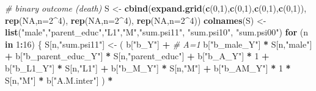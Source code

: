 \documentclass[
]{book}
\newenvironment{Shaded}{\begin{snugshade}}{\end{snugshade}}
\newcommand{\AttributeTok}[1]{\textcolor[rgb]{0.13,0.29,0.53}{#1}}
\newcommand{\CommentTok}[1]{\textcolor[rgb]{0.56,0.35,0.01}{\textit{#1}}}
\newcommand{\ConstantTok}[1]{\textcolor[rgb]{0.56,0.35,0.01}{#1}}
\newcommand{\ControlFlowTok}[1]{\textcolor[rgb]{0.13,0.29,0.53}{\textbf{#1}}}
\newcommand{\DecValTok}[1]{\textcolor[rgb]{0.00,0.00,0.81}{#1}}
\newcommand{\FunctionTok}[1]{\textcolor[rgb]{0.13,0.29,0.53}{\textbf{#1}}}
\newcommand{\NormalTok}[1]{#1}
\newcommand{\OtherTok}[1]{\textcolor[rgb]{0.56,0.35,0.01}{#1}}
\newcommand{\SpecialCharTok}[1]{\textcolor[rgb]{0.81,0.36,0.00}{\textbf{#1}}}
\newcommand{\StringTok}[1]{\textcolor[rgb]{0.31,0.60,0.02}{#1}}
\begin{document}
\begin{Shaded}
\begin{Highlighting}[]
  \CommentTok{\# binary outcome (death)}
\NormalTok{  S }\OtherTok{\textless{}{-}} \FunctionTok{cbind}\NormalTok{(}\FunctionTok{expand.grid}\NormalTok{(}\FunctionTok{c}\NormalTok{(}\DecValTok{0}\NormalTok{,}\DecValTok{1}\NormalTok{),}\FunctionTok{c}\NormalTok{(}\DecValTok{0}\NormalTok{,}\DecValTok{1}\NormalTok{),}\FunctionTok{c}\NormalTok{(}\DecValTok{0}\NormalTok{,}\DecValTok{1}\NormalTok{),}\FunctionTok{c}\NormalTok{(}\DecValTok{0}\NormalTok{,}\DecValTok{1}\NormalTok{)), }\FunctionTok{rep}\NormalTok{(}\ConstantTok{NA}\NormalTok{,}\AttributeTok{n=}\DecValTok{2}\SpecialCharTok{\^{}}\DecValTok{4}\NormalTok{), }\FunctionTok{rep}\NormalTok{(}\ConstantTok{NA}\NormalTok{,}\AttributeTok{n=}\DecValTok{2}\SpecialCharTok{\^{}}\DecValTok{4}\NormalTok{), }
             \FunctionTok{rep}\NormalTok{(}\ConstantTok{NA}\NormalTok{,}\AttributeTok{n=}\DecValTok{2}\SpecialCharTok{\^{}}\DecValTok{4}\NormalTok{))}
  \FunctionTok{colnames}\NormalTok{(S) }\OtherTok{\textless{}{-}} \FunctionTok{list}\NormalTok{(}\StringTok{"male"}\NormalTok{,}\StringTok{"parent\_educ"}\NormalTok{,}\StringTok{"L1"}\NormalTok{,}\StringTok{"M"}\NormalTok{,}\StringTok{"sum.psi11"}\NormalTok{, }\StringTok{"sum.psi10"}\NormalTok{, }\StringTok{"sum.psi00"}\NormalTok{)}
  \ControlFlowTok{for}\NormalTok{ (n }\ControlFlowTok{in} \DecValTok{1}\SpecialCharTok{:}\DecValTok{16}\NormalTok{) \{}
\NormalTok{    S[n,}\StringTok{"sum.psi11"}\NormalTok{] }\OtherTok{\textless{}{-}}\NormalTok{  ( b[}\StringTok{"b\_Y"}\NormalTok{] }\SpecialCharTok{+}                                            \CommentTok{\# A=1}
\NormalTok{                             b[}\StringTok{"b\_male\_Y"}\NormalTok{] }\SpecialCharTok{*}\NormalTok{ S[n,}\StringTok{"male"}\NormalTok{] }\SpecialCharTok{+} 
\NormalTok{                             b[}\StringTok{"b\_parent\_educ\_Y"}\NormalTok{] }\SpecialCharTok{*}\NormalTok{ S[n,}\StringTok{"parent\_educ"}\NormalTok{] }\SpecialCharTok{+} 
\NormalTok{                             b[}\StringTok{"b\_A\_Y"}\NormalTok{] }\SpecialCharTok{*} \DecValTok{1} \SpecialCharTok{+} 
\NormalTok{                             b[}\StringTok{"b\_L1\_Y"}\NormalTok{] }\SpecialCharTok{*}\NormalTok{ S[n,}\StringTok{"L1"}\NormalTok{] }\SpecialCharTok{+}
\NormalTok{                             b[}\StringTok{"b\_M\_Y"}\NormalTok{] }\SpecialCharTok{*}\NormalTok{ S[n,}\StringTok{"M"}\NormalTok{] }\SpecialCharTok{+}
\NormalTok{                             b[}\StringTok{"b\_AM\_Y"}\NormalTok{] }\SpecialCharTok{*} \DecValTok{1} \SpecialCharTok{*}\NormalTok{ S[n,}\StringTok{"M"}\NormalTok{] }\SpecialCharTok{*}\NormalTok{ b[}\StringTok{"A.M.inter"}\NormalTok{] ) }\SpecialCharTok{*}

\end{Highlighting}
\end{Shaded}
\end{document}
